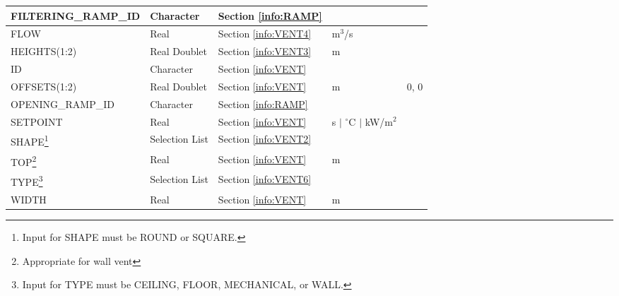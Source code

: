 \begin{minipage}{6.5in}
\begin{longtable}{@{\extracolsep{\fill}}|l|l|l|l|l|}
{\ct FILTERING\_RAMP\_ID}    					 & Character  		  & Section \ref{info:RAMP}      &                             &                 \\ \hline
{\ct FLOW}      	 					 & Real  		  & Section \ref{info:VENT4}     & m$^3$/s                     &                 \\ \hline
{\ct HEIGHTS(1:2)}      					 & Real Doublet  	  & Section \ref{info:VENT3}     & m                           &                 \\ \hline
{\ct ID}                                                         & Character  	          & Section \ref{info:VENT}      &                             &                 \\ \hline
{\ct OFFSETS(1:2)}       					 & Real Doublet 		  & Section \ref{info:VENT}      & m                           &      0, 0        \\ \hline
{\ct OPENING\_RAMP\_ID}  					 & Character  		  & Section \ref{info:RAMP}      &                             &                 \\ \hline
{\ct SETPOINT}           					 & Real  	          & Section \ref{info:VENT}      & s $\mid$ $^\circ$C $\mid$ kW/m$^2$ &                 \\ \hline
{\ct SHAPE}\footnote{Input for {\ct SHAPE} must be {\ct ROUND} or {\ct SQUARE}.}
                                                                 & Selection List         & Section \ref{info:VENT2}     &                             &                 \\ \hline
{\ct TOP}\footnote{Appropriate for wall vent}                    & Real  	  	  & Section \ref{info:VENT}      & m                           &                 \\ \hline
{\ct TYPE}\footnote{Input for {\ct TYPE} must be {\ct CEILING}, {\ct FLOOR}, {\ct MECHANICAL}, or {\ct WALL}. }
                                                                 & Selection List         & Section \ref{info:VENT6}     &                             &                 \\ \hline
{\ct WIDTH}                                                      & Real                   & Section \ref{info:VENT}      & m                           &                 \\ \hline
\end{longtable}
\end{minipage}


